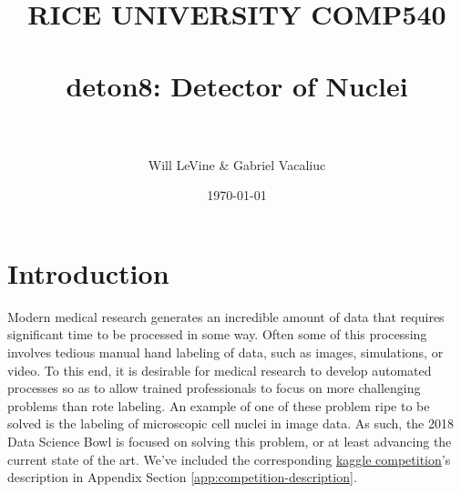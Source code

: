 \documentclass[paper=letter, fontsize=12pt]{article}
\title{
\normalfont \normalsize
\textsc{RICE UNIVERSITY COMP540} \\ [25pt]
\horrule{0.5pt} \\[0.4cm] %
\huge deton8: Detector of Nuclei \\ %
\horrule{2pt} \\[0.5cm] %
}
\author{Will LeVine \& Gabriel Vacaliuc}
\date{\normalsize\today}
\numberwithin{equation}{section} %
\numberwithin{figure}{section} %
\numberwithin{table}{section} %
\begin{document}
\maketitle

\begin{abstract}
    \blindtext
\end{abstract}

\newpage

\tableofcontents

\newpage



\section{Introduction}

Modern medical research generates an incredible amount of data that requires
significant time to be processed in some way.  Often some of this processing
involves tedious manual hand labeling of data, such as images, simulations, or
video.  To this end, it is desirable for medical research to develop automated
processes so as to allow trained professionals to focus on more challenging
problems than rote labeling.  An example of one of these problem ripe to be
solved is the labeling of microscopic cell nuclei in image data.  As such, the
2018 Data Science Bowl is focused on solving this problem, or at least
advancing the current state of the art.  We've included the corresponding
\href{https://www.kaggle.com/c/data-science-bowl-2018}{kaggle competition}'s
description in Appendix Section \ref{app:competition-description}.
\end{document}
